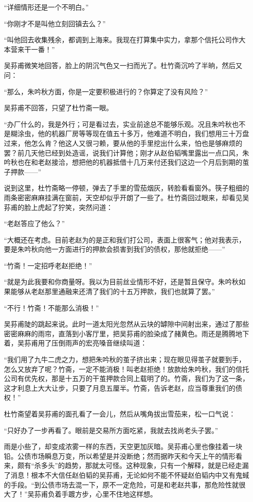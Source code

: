 \par “详细情形还是一个不明白。”
\par “你刚才不是叫他立刻回镇去么？”
\par “叫他回去收集残余，都调到上海来。我现在打算集中实力，拿那个信托公司作大本营来干一番！”
\par 吴荪甫微笑地回答，脸上的阴沉气色又一扫而光了。杜竹斋沉吟了半晌，然后又问：
\par “那么，朱吟秋方面，你是一定要积极进行的？你算定了没有风险？”
\par 吴荪甫不回答，只望了杜竹斋一眼。
\par “办厂什么的，我是外行；可是看过去，实业前途总不能够乐观。况且朱吟秋也不是糊涂虫，他的机器厂房等等现在值五十多万，他难道不明白，我们想用三十万盘过来，他怎么肯？他这人又很刁赖，要从他的手里挖出什么来，怕也是够麻烦的罢？前几天他已经到处造谣，说我们计算他；刚才从赵伯韬嘴里露出一点口风，朱吟秋也在和老赵接洽，想把他的机器抵借十几万来付还我们这边一个月后到期的茧子押款——”
\par 说到这里，杜竹斋略一停顿，弹去了手里的雪茄烟灰，转脸看看窗外。筷子粗细的雨条密密麻麻挂满在窗前，天空却似乎开朗了一些了。杜竹斋回过眼来，却看见吴荪甫的脸上虎起了狞笑，突然问道：
\par “老赵答应了他么？”
\par “大概还在考虑。目前老赵为的是正和我们打公司，表面上很客气；他对我表示，要是朱吟秋向他一方面进行的押款会损害到我们的债权，那他就拒绝——”
\par “竹斋！一定招呼老赵拒绝！”
\par “就是为此我要和你商量呀。我以为目前丝业情形不好，还是暂且保守。朱吟秋如果能够从老赵那里通融来还清了我们的十五万押款，我们也就算了罢。”
\par “不行！竹斋！不能那么消极！”
\par 吴荪甫陡的跳起来说。此时一道太阳光忽然从云块的罅隙中间射出来，通过了那些密密麻麻的雨帘，直落到小客厅里，把吴荪甫的脸染成了赭黄色。雨还是腾腾地下着，吴荪甫用了压倒雨声的宏亮嗓音继续叫道：
\par “我们用了九牛二虎之力，想把朱吟秋的茧子挤出来；现在眼见得茧子就要到手，怎么又放弃了呢？竹斋，一定不能消极！叫老赵拒绝！放款给朱吟秋，我们的信托公司有优先权，那是十五万的干茧押款合同上载明了的。竹斋，我们为了这一条，这才利息上大大让步，只要了月息五厘半。竹斋，告诉老赵，应当尊重我们的债权！”
\par 杜竹斋望着吴荪甫的面孔看了一会儿，然后从嘴角拔出雪茄来，松一口气说：
\par “只好办了一步再看了。眼前是交易所方面吃紧，我就去找尚老头子罢。”
\par 雨是小些了，却变成浓雾一样的东西，天空更加灰暗。吴荪甫心里也像挂着一块铅。公债市场瞬息万变，所以希望是并没断绝；然而据昨天和今天上午的情形看来，颇有“杀多头”的趋势，那就太可怪。这种现象，只有一个解释，就是已经走漏了消息！根本不大信任赵伯韬的吴荪甫，无论如何不能不怀疑赵伯韬内中又有鬼蜮的手段。“到公债市场去混一下，原不一定危险，可是和老赵共事，那危险性就很大了！”吴荪甫负着手踱方步，心里不住地这样想。

